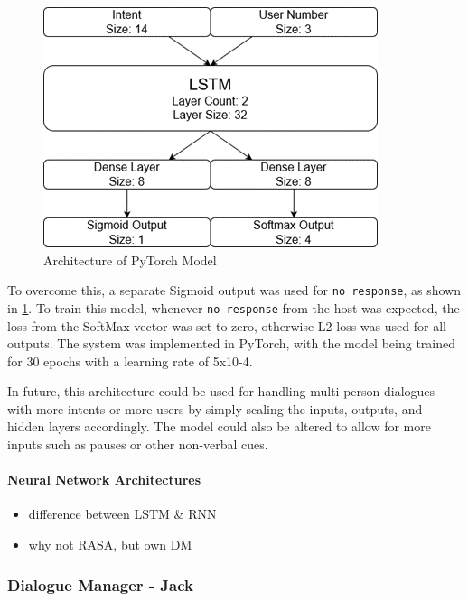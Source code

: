 \documentclass[hidelinks, 11pt]{article}
\begin{document}
\begin{figure}
  \includegraphics[width=\columnwidth]{images/DM_LSTM.png}
  \caption{Architecture of PyTorch Model}
  \label{fig:model_architecture}
\end{figure}

To overcome this, a separate Sigmoid output was used for \verb|no response|, as shown in \cref{fig:model_architecture}. To train this model, whenever \verb|no response| from the host was expected, the loss from the SoftMax vector was set to zero, otherwise L2 loss was used for all outputs. The system was implemented in PyTorch, with the model being trained for 30 epochs with a learning rate of 5x10-4.

In future, this architecture could be used for handling multi-person dialogues with more intents or more users by simply scaling the inputs, outputs, and hidden layers accordingly. The model could also be altered to allow for more inputs such as pauses or other non-verbal cues.

\paragraph{Neural Network Architectures}
\label{par:nn_architectures}

\begin{itemize}
  \item difference between LSTM \& RNN
  \item why not RASA, but own DM
\end{itemize}

\subsubsection{Dialogue Manager - Jack}
\label{subsec:dm}
\end{document}
